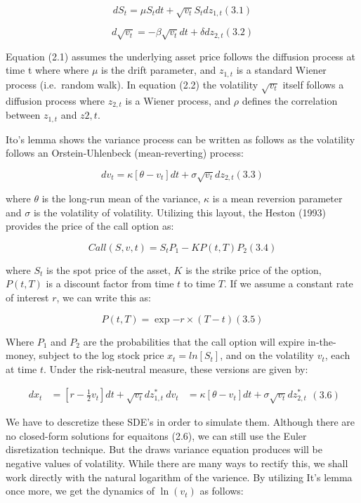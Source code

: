 \documentclass[11pt,]{article}
\begin{document}
\[
dS_{t} = \mu S_{t} dt + \sqrt{v_{t}} S_{t} dz_{1,t}                 (3.1)
\]

\[ 
d\sqrt{v_{t}} = -\beta \sqrt{v_{t}} dt + \delta dz_{2,t}            (3.2)
\]

Equation (2.1) assumes the underlying asset price follows the diffusion
process at time t where where \(\mu\) is the drift parameter, and
\(z_{1,t}\) is a standard Wiener process (i.e.~random walk). In equation
(2.2) the volatility \(\sqrt{v_{t}}\) itself follows a diffusion process
where \(z_{2,t}\) is a Wiener process, and \(\rho\) defines the
correlation between \(z_{1,t}\) and \(z{2,t}\).

Ito's lemma shows the variance process can be written as follows as the
volatility follows an Orstein-Uhlenbeck (mean-reverting) process:

\[
dv_{t} = \kappa [\theta - v_{t}] dt + \sigma \sqrt{v_{t}} d z_{2,t} (3.3)
\]

where \(\theta\) is the long-run mean of the variance, \(\kappa\) is a
mean reversion parameter and \(\sigma\) is the volatility of volatility.
Utilizing this layout, the Heston (1993) provides the price of the call
option as:

\[
Call(S,v,t) = S_{t} P_{1} - K P(t,T) P_{2}                          (3.4)
\]

where \(S_{t}\) is the spot price of the asset, \(K\) is the strike
price of the option, \(P(t,T)\) is a discount factor from time \(t\) to
time \(T\). If we assume a constant rate of interest \(r\), we can write
this as:

\[
P(t,T) = \exp{-r \times (T - t)}                                    (3.5)
\]

Where \(P_{1}\) and \(P_{2}\) are the probabilities that the call option
will expire in-the-money, subject to the log stock price
\(x_{t} = ln[S_{t}]\), and on the volatility \(v_{t}\), each at time
\(t\). Under the risk-neutral measure, these versions are given by:

\[
\begin{aligned} dx_{t} &= \left[r -\frac{1}{2}v_{t} \right] dt + \sqrt{v_{t}} dz_{1,t}^{\ast} \ dv_{t} &= \kappa \left[\theta - v_{t} \right] dt + \sigma \sqrt{v_{t}} dz_{2,t}^{\ast} \end{aligned}                                          (3.6)
\]

We have to descretize these SDE's in order to simulate them. Although
there are no closed-form solutions for equaitons (2.6), we can still use
the Euler disretization technique. But the draws variance equation
produces will be negative values of volatility. While there are many
ways to rectify this, we shall work directly with the natural logarithm
of the varience. By utilizing It's lemma once more, we get the dynamics
of \(\ln{(v_{t})}\) as follows:
\end{document}
